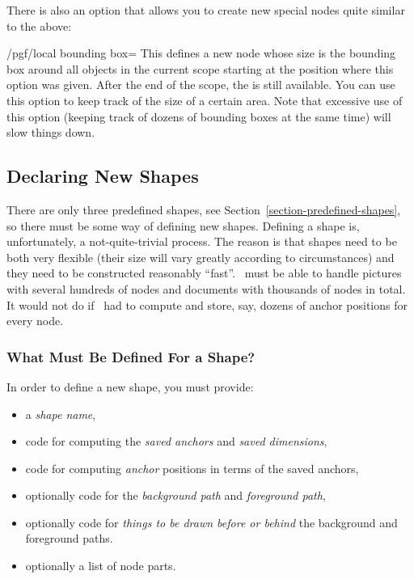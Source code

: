 There is also an option that allows you to create new special nodes quite
similar to the above:
%
\begin{key}{/pgf/local bounding box=}
    This defines a new node  whose size is the bounding box
    around all objects in the current scope starting at the position where this
    option was given. After the end of the scope, the  is still
    available. You can use this option to keep track of the size of a certain
    area. Note that excessive use of this option (keeping track of dozens of
    bounding boxes at the same time) will slow things down.
\begin{codeexample}[preamble={\usetikzlibrary{scopes}}]
\end{codeexample}
\end{key}


\subsection{Declaring New Shapes}

There are only three predefined shapes, see
Section~\ref{section-predefined-shapes}, so there must be some way of defining
new shapes. Defining a shape is, unfortunately, a not-quite-trivial process.
The reason is that shapes need to be both very flexible (their size will vary
greatly according to circumstances) and they need to be constructed reasonably
``fast''. \pgfname\ must be able to handle pictures with several hundreds of
nodes and documents with thousands of nodes in total. It would not do if
\pgfname\ had to compute and store, say, dozens of anchor positions for every
node.


\subsubsection{What Must Be Defined For a Shape?}

In order to define a new shape, you must provide:
%
\begin{itemize}
    \item a \emph{shape name},
    \item code for computing the \emph{saved anchors} and \emph{saved
    dimensions},
    \item code for computing \emph{anchor} positions in terms of the saved
        anchors,
    \item optionally code for the \emph{background path} and \emph{foreground
        path},
    \item optionally code for \emph{things to be drawn before or behind} the
        background and foreground paths.
    \item optionally a list of node parts.
\end{itemize}



